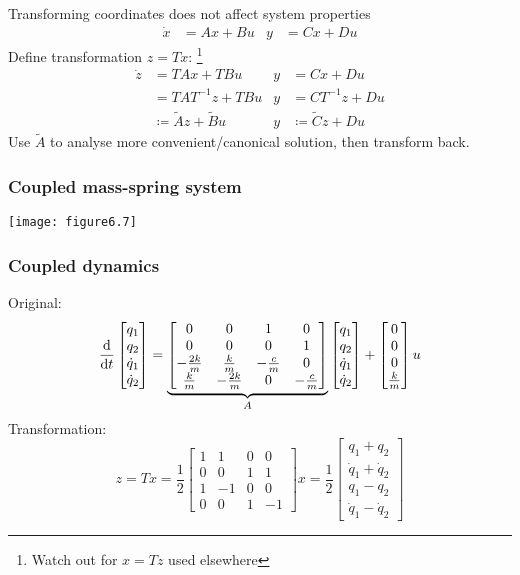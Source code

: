 \documentclass{beamer-control}
\begin{document}
\begin{frame}{Transforming coordinates does not affect system properties}
\begin{align}
\dot x &= Ax + Bu & y &= Cx+Du
\end{align}
Define transformation $z=Tx$: \footnote{Watch out for $x=Tz$ used elsewhere}
\begin{align}
\dot z &= TAx + TBu & y &= Cx+Du \\ 
       &= TAT^{-1}z + TBu & y &= CT^{-1}z + Du \\
       &\coloneq \tilde A z + \tilde B u & y &\coloneq \tilde C z + Du
\end{align}
Use $\tilde A$ to analyse more convenient/canonical solution, then transform back.
\end{frame}

\begin{frame}
\frametitle{Coupled mass-spring system}
\vspace*{0pt plus 1filll}
\texttt{[image: figure6.7]}

\end{frame}

\begin{frame}
\frametitle{Coupled dynamics}

Original:
\[
\frac{\mathrm{d} }{\mathrm{d} t}\begin{bmatrix}q_1\\q_2\\\dot q_1\\\dot q_2\end{bmatrix} =
\underbrace{\begin{bmatrix}
0 & 0 & 1 & 0 \\
0 & 0 & 0 & 1 \\
-\frac{2k}{m} & \frac{k}{m} & -\frac{c}{m} & 0 \\
\frac{k}{m} & -\frac{2k}{m} & 0 & -\frac{c}{m}
\end{bmatrix}}_{A}
\begin{bmatrix}q_1\\q_2\\\dot q_1\\\dot q_2\end{bmatrix} +
\begin{bmatrix}
0 \\
0 \\
0 \\
\frac{k}{m}
\end{bmatrix}
u
\]
Transformation:
\[
z = T x = \frac{1}{2}
\begin{bmatrix}
1 & 1 & 0 & 0 \\
0 & 0 & 1 & 1 \\
1 & -1 & 0 & 0 \\
0 & 0 & 1 & -1
\end{bmatrix}
x
=
\frac12
\begin{bmatrix}
q_1 + q_2 \\
\dot{q}_1 + \dot{q}_2 \\
q_1 - q_2 \\
\dot{q}_1 - \dot{q}_2
\end{bmatrix}
\]


\end{frame}
\end{document}
